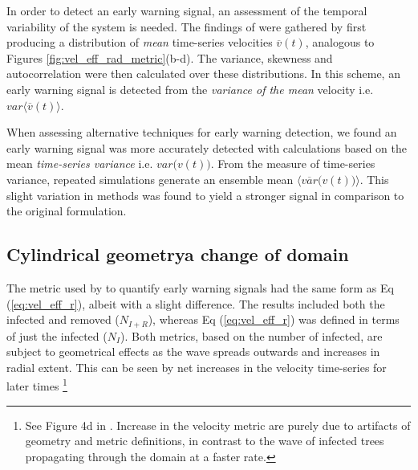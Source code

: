 In order to detect an early warning signal, an assessment of  the temporal variability of the system is needed. %
The findings of \cite{OROZCOFUENTES201912} were gathered by first producing a distribution of \textit{mean} time-series velocities $\overline{v}(t)$, %
analogous to Figures \ref{fig:vel_eff_rad_metric}(b-d). %
The variance, skewness and autocorrelation were then calculated over these distributions. %
In this scheme, an early warning signal is detected from the \textit{variance of the mean} velocity i.e. $var\big\langle \overline{v}(t) \big\rangle $. %


When assessing alternative techniques for early warning detection, we found an early warning signal was more accurately %
detected with calculations based on the mean \textit{time-series variance} i.e. $var\big(v(t) \big)$. %
From the measure of time-series variance, repeated simulations generate an ensemble mean $\langle \overline{var}\big(v(t) \big)\rangle$. %
This slight variation in methods was found to yield a stronger signal in comparison to the original formulation. %

\subsection{Cylindrical geometry\textemdash a change of domain}

The metric used by \cite{OROZCOFUENTES201912} to quantify early warning signals had the same form as Eq (\ref{eq:vel_eff_r}), albeit with a slight difference. %
The results included both the infected and removed ($N_{I+R}$), whereas Eq (\ref{eq:vel_eff_r}) %
was defined in terms of just the infected ($N_I$). %
Both metrics, based on the number of infected, are subject to geometrical effects as the wave %
spreads outwards and increases in radial extent. %
This can be seen by net increases in the velocity time-series for later times %
\footnote{See Figure 4d in \cite{OROZCOFUENTES201912}. Increase in the velocity metric are purely due to artifacts of geometry and metric definitions, in contrast to the wave of infected trees propagating through the domain at a faster rate.}

